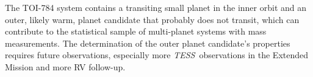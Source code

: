 \documentclass[twocolumn]{aastex631}
\newcommand\aastex{AAS\TeX}
\newcommand{\tess}{\textit{TESS}\ }
\begin{document}
The TOI-784 system contains a transiting small planet in the inner orbit and an outer, likely warm, planet candidate that probably does not transit, which can contribute to the statistical sample of multi-planet systems with mass measurements. The determination of the outer planet candidate's properties requires future observations, especially more \tess observations in the Extended Mission and more RV follow-up.  






%
\end{document}
